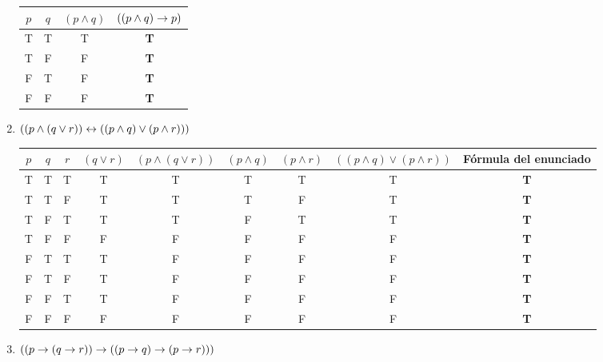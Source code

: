 \begin{enumerate}[label=\alph*)]
            \begin{tabular}{|c|c|c|c|}
                  \hline
                  $p$ & $q$ & $(p \land q)$ & $((p \land q) \rightarrow p)$ \\
                  \hline
                  T   & T   & T             & \textbf{T}              \\
                  T   & F   & F             & \textbf{T}              \\
                  F   & T   & F             & \textbf{T}              \\
                  F   & F   & F             & \textbf{T}              \\
                  \hline
            \end{tabular}

      \item $((p \land (q \lor r)) \leftrightarrow ((p \land q) \lor (p \land r)))$

            \begin{tabular}{|c|c|c|c|c|c|c|c|c|}
                  \hline
                  $p$ & $q$ & $r$ & $(q \lor r)$ & $(p \land (q \lor r))$ & $(p \land q)$ & $(p \land r)$ & $((p \land q) \lor (p \land r))$ & Fórmula del enunciado \\
                  \hline
                  T   & T   & T   & T            & T                      & T             & T             & T                                & \textbf{T}            \\
                  T   & T   & F   & T            & T                      & T             & F             & T                                & \textbf{T}            \\
                  T   & F   & T   & T            & T                      & F             & T             & T                                & \textbf{T}            \\
                  T   & F   & F   & F            & F                      & F             & F             & F                                & \textbf{T}            \\
                  F   & T   & T   & T            & F                      & F             & F             & F                                & \textbf{T}            \\
                  F   & T   & F   & T            & F                      & F             & F             & F                                & \textbf{T}            \\
                  F   & F   & T   & T            & F                      & F             & F             & F                                & \textbf{T}            \\
                  F   & F   & F   & F            & F                      & F             & F             & F                                & \textbf{T}            \\
                  \hline
            \end{tabular}

      \item $((p \rightarrow (q \rightarrow r)) \rightarrow ((p \rightarrow q) \rightarrow (p \rightarrow r)))$ \hacer
\end{enumerate}

